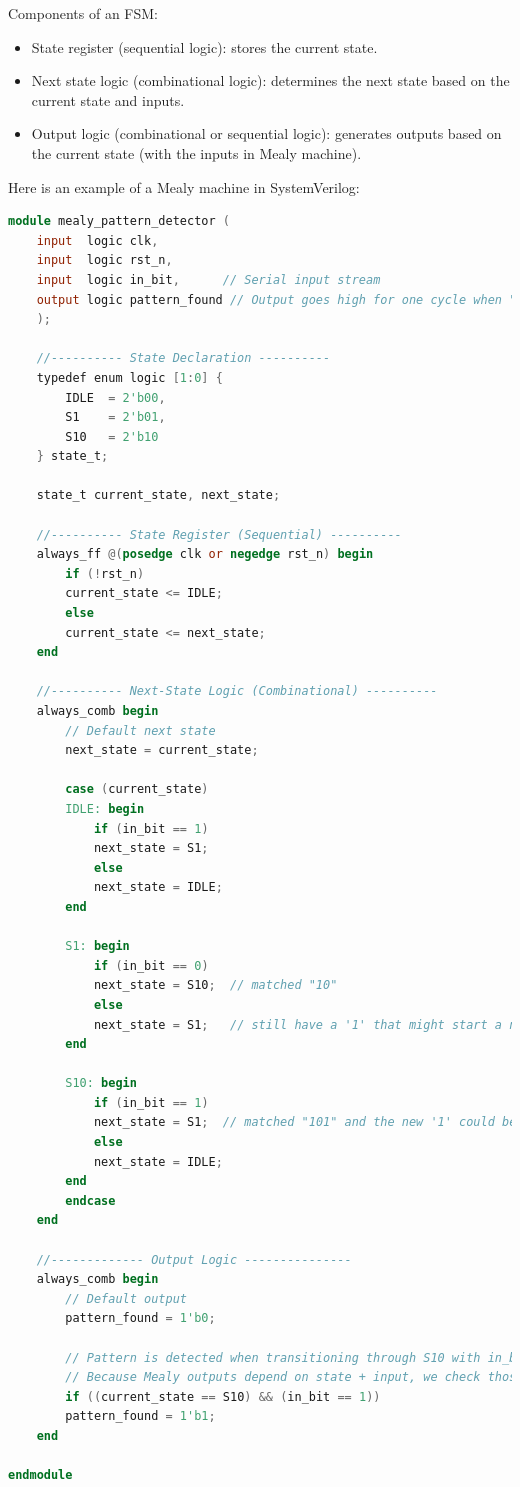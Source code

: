 \documentclass{article}
\begin{document}
Components of an FSM:
\begin{itemize}
    \item State register (sequential logic): stores the current state.
    \item Next state logic (combinational logic): determines the next state based on the current state and inputs.
    \item Output logic (combinational or sequential logic): generates outputs based on the current state (with the inputs in Mealy machine).
\end{itemize}
Here is an example of a Mealy machine in SystemVerilog:
\begin{lstlisting}[language=Verilog,frame=single,backgroundcolor=\color{White},basicstyle=\color{LightGreen},showspaces=false,showstringspaces=false]
module mealy_pattern_detector (
    input  logic clk,
    input  logic rst_n,
    input  logic in_bit,      // Serial input stream
    output logic pattern_found // Output goes high for one cycle when "101" is detected
    );
    
    //---------- State Declaration ----------
    typedef enum logic [1:0] {
        IDLE  = 2'b00,
        S1    = 2'b01,
        S10   = 2'b10
    } state_t;
    
    state_t current_state, next_state;
    
    //---------- State Register (Sequential) ----------
    always_ff @(posedge clk or negedge rst_n) begin
        if (!rst_n)
        current_state <= IDLE;
        else
        current_state <= next_state;
    end
    
    //---------- Next-State Logic (Combinational) ----------
    always_comb begin
        // Default next state
        next_state = current_state;
        
        case (current_state)
        IDLE: begin
            if (in_bit == 1)
            next_state = S1;
            else
            next_state = IDLE;
        end
    
        S1: begin
            if (in_bit == 0)
            next_state = S10;  // matched "10"
            else
            next_state = S1;   // still have a '1' that might start a new pattern
        end
    
        S10: begin
            if (in_bit == 1)
            next_state = S1;  // matched "101" and the new '1' could be a start
            else
            next_state = IDLE;
        end
        endcase
    end
    
    //------------- Output Logic ---------------
    always_comb begin
        // Default output
        pattern_found = 1'b0;
    
        // Pattern is detected when transitioning through S10 with in_bit == 1
        // Because Mealy outputs depend on state + input, we check those conditions directly
        if ((current_state == S10) && (in_bit == 1))
        pattern_found = 1'b1;
    end
    
endmodule
\end{lstlisting}
\end{document}
